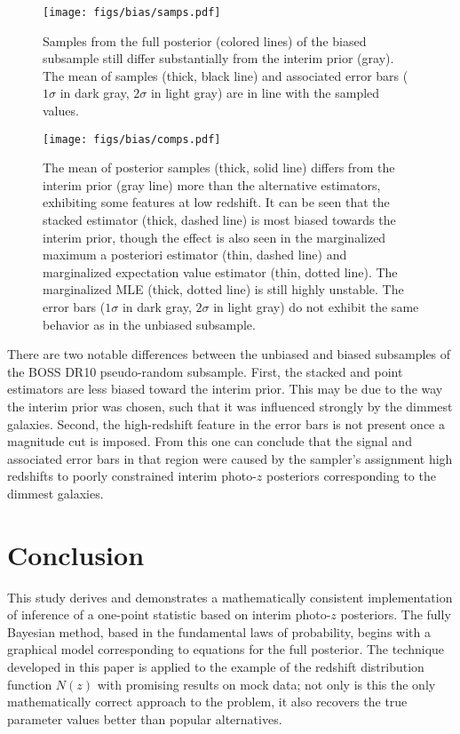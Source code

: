 \begin{figure}
	\texttt{[image: figs/bias/samps.pdf]}
	\caption{Samples from the full posterior (colored lines) of the biased subsample still differ substantially from the interim prior (gray).  
		The mean of samples (thick, black line) and associated error bars ($1\sigma$ in dark gray, $2\sigma$ in light gray) are in line with the sampled values.}
\end{figure}

\begin{figure}
	\texttt{[image: figs/bias/comps.pdf]}
	\caption{The mean of posterior samples (thick, solid line) differs from the interim prior (gray line) more than the alternative estimators, exhibiting some features at low redshift.  
		It can be seen that the stacked estimator (thick, dashed line) is most biased towards the interim prior, though the effect is also seen in the marginalized maximum a posteriori estimator (thin, dashed line) and marginalized expectation value estimator (thin, dotted line).  
		The marginalized MLE (thick, dotted line) is still highly unstable.  
		The error bars ($1\sigma$ in dark gray, $2\sigma$ in light gray) do not exhibit the same behavior as in the unbiased subsample.}
\end{figure}

There are two notable differences between the unbiased and biased subsamples of the BOSS DR10 pseudo-random subsample.  
First, the stacked and point estimators are less biased toward the interim prior.  
This may be due to the way the interim prior was chosen, such that it was influenced strongly by the dimmest galaxies.  
Second, the high-redshift feature in the error bars is not present once a magnitude cut is imposed.  
From this one can conclude that the signal and associated error bars in that region were caused by the sampler's assignment high redshifts to poorly constrained interim photo-$z$ posteriors corresponding to the dimmest galaxies.  

\section{Conclusion}

This study derives and demonstrates a mathematically consistent implementation of inference of a one-point statistic based on interim photo-$z$ posteriors.  
The fully Bayesian method, based in the fundamental laws of probability, begins with a graphical model corresponding to equations for the full posterior.  
The technique developed in this paper is applied to the example of the redshift distribution function $N(z)$ with promising results on mock data; not only is this the only mathematically correct approach to the problem, it also recovers the true parameter values better than popular alternatives.  

